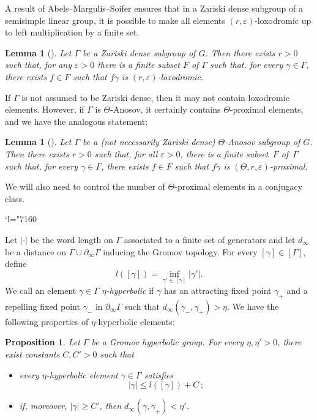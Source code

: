 \documentclass[JEP,XML,SOM,Unicode,NoEqCountersInSection,NoFloatCountersInSection,published]{cedram}
\newcommand{\Changel}{\mathcode`l="7160}
\newtheorem{lemma}[theo]{Lemma}
\newtheorem{prop}[theo]{Proposition}
\theoremstyle{definition}
\let\epsilon\varepsilon
\let\G\Gamma
\begin{document}
A result of Abels--Margulis--Soifer ensures that in a Zariski dense subgroup of a semisimple linear group, it is possible to make all elements $(r,\epsilon)$-loxodromic up to left multiplication by a finite set.
\begin{lemma}[{\cite[Th.\,6.8]{abels1995semigroups}}]\label{lem-AMS}
Let $\Gamma$ be a Zariski dense subgroup of $G$. Then there exists $r>0$ such that, for any $\epsilon>0$ there is a finite subset $F$ of $\Gamma$ such that, for every $\gamma \in \Gamma$, there exists $f\in F$ such that $f\gamma$ is $(r,\epsilon)$-loxodromic.
\end{lemma}

If $\Gamma$ is not assumed to be Zariski dense, then it may not contain loxodromic elements. However, if $\Gamma$ is $\Theta$-Anosov, it certainly contains $\Theta$-proximal elements, and we have the analogous statement:

\begin{lemma}[{\cite[Th.\,5.9]{guichard2012anosov}}]\label{lem-AMS guichard wienhard}
Let $\Gamma$ be a (not necessarily Zariski dense) $\Theta$-Anosov subgroup of $G$. Then there exists $r>0$ such that, for all $\epsilon>0$, there is a finite subset~$F$ of~$\Gamma$ such that, for every $\gamma \in \Gamma$, there exists $f\in F$ such that $f\gamma$ is $(\Theta,r,\epsilon)$-proximal.
\end{lemma}

We will also need to control the number of $\Theta$-proximal elements in a conjugacy class.

\Changel

Let $\vert \cdot \vert$ be the word length on $\Gamma$ associated to a finite set of generators and let $d_\infty$ be a distance on $\Gamma \cup \partial_\infty \Gamma$ inducing the Gromov topology. For every $[\gamma] \in [\Gamma]$, define
\[l([\gamma]) = \inf_{\gamma'\in [\gamma]} \vert \gamma'\vert.\]
We call an element $\gamma \in \Gamma$ \emph{$\eta$-hyperbolic} if $\gamma$ has an attracting fixed point $\gamma_+$ and a repelling fixed point $\gamma_-$ in $\partial_\infty \Gamma$ such that $d_\infty (\gamma_-,\gamma_+) >\eta$. We have the following properties of $\eta$-hyperbolic elements:

\begin{prop} \label{prop-Properties hyperbolic elements}
Let $\G$ be a Gromov hyperbolic group. For every $\eta, \eta'>0$, there exist constants $C,C'>0$ such that
\begin{itemize}
\item every $\eta$-hyperbolic element $\gamma \in \Gamma$ satisfies
\[\vert \gamma \vert \leq l([\gamma]) + C\,;\]
\item if, moreover, $\vert \gamma \vert \geq C'$, then $d_\infty(\gamma, \gamma_+) <\eta'$.
\end{itemize}
\end{prop}
\end{document}
